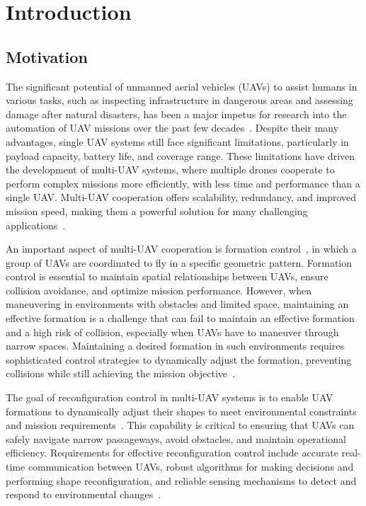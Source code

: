 \chapter{Introduction}\label{chap1}

\section{Motivation}\label{sec11}
The significant potential of unmanned aerial vehicles (UAVs) to assist humans in various tasks, such as inspecting infrastructure in dangerous areas and assessing damage after natural disasters, has been a major impetus for research into the automation of UAV missions over the past few decades~\cite{9306908}. Despite their many advantages, single UAV systems still face significant limitations, particularly in payload capacity, battery life, and coverage range. These limitations have driven the development of multi-UAV systems, where multiple drones cooperate to perform complex missions more efficiently, with less time and performance than a single UAV. Multi-UAV cooperation offers scalability, redundancy, and improved mission speed, making them a powerful solution for many challenging applications~\cite{Skorobogatov2020,Tang2022}.

An important aspect of multi-UAV cooperation is formation control~\cite{Oh2015}, in which a group of UAVs are coordinated to fly in a specific geometric pattern. Formation control is essential to maintain spatial relationships between UAVs, ensure collision avoidance, and optimize mission performance. However, when maneuvering in environments with obstacles and limited space, maintaining an effective formation is a challenge that can fail to maintain an effective formation and a high risk of collision, especially when UAVs have to maneuver through narrow spaces. Maintaining a desired formation in such environments requires sophisticated control strategies to dynamically adjust the formation, preventing collisions while still achieving the mission objective~\cite{Huang2019,Rastgoftar2019}.

The goal of reconfiguration control in multi-UAV systems is to enable UAV formations to dynamically adjust their shapes to meet environmental constraints and mission requirements~\cite{Oh2015,Huang2019}. This capability is critical to ensuring that UAVs can safely navigate narrow passageways, avoid obstacles, and maintain operational efficiency. Requirements for effective reconfiguration control include accurate real-time communication between UAVs, robust algorithms for making decisions and performing shape reconfiguration, and reliable sensing mechanisms to detect and respond to environmental changes~\cite{736776,Berlinger2021,9565893,Elkilany2020,AlonsoMora2018,Vsrhelyi2018,7828016,Wu2020}.

